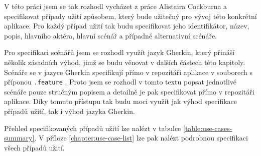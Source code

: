 V této práci jsem se tak rozhodl vycházet z práce Alistaira Cockburna \cite{Cockburn2001WritingEffectiveUseCases} a specifikovat případy užití způsobem, který bude užitečný pro vývoj této konkrétní aplikace. Pro každý případ užití tak budu specifikovat jeho identifikátor, název, popis, hlavního aktéra, hlavní scénář a případné alternativní scénáře. 

Pro specifikaci scénářů jsem se rozhodl využít jazyk Gherkin, který přináší několik zásadních výhod, jimž se budu věnovat v dalších částech této kapitoly. Scénáře se v jazyce Gherkin specifikují přímo v repozitáři aplikace v souborech s příponou \texttt{.feature} \cite{CucumberDocs}. Proto jsem se rozhodl v tomto textu popsat jednotlivé scénáře pouze stručným popisem a detailně je pak specifikovat přímo v repozitáři aplikace. Díky tomuto přístupu tak budu moci využít jak výhod specifikace případů užití, tak i výhod jazyka Gherkin.

Přehled specifikovaných případů užití lze nalézt v tabulce \ref{table:use-cases-summary}. V příloze \ref{chapter:use-case-list} lze pak nalézt podrobnou specifikaci všech případů užití.

